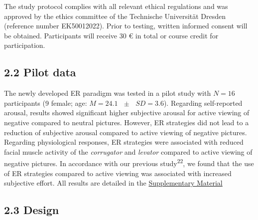 \documentclass[
  english,
  man,floatsintext]{apa6}
\begin{document}
The study protocol complies with all relevant ethical regulations and was approved by the ethics committee of the Technische Universität Dresden (reference number EK50012022).
Prior to testing, written informed consent will be obtained.
Participants will receive 30 € in total or course credit for participation.

\hypertarget{pilot-data}{%
\subsection{2.2 Pilot data}\label{pilot-data}}

The newly developed ER paradigm was tested in a pilot study with \(N=16\) participants (9 female; age: \(M = 24.1\text{ }\pm\text{ }SD = 3.6\)).
Regarding self-reported arousal, results showed significant higher subjective arousal for active viewing of negative compared to neutral pictures.
However, ER strategies did not lead to a reduction of subjective arousal compared to active viewing of negative pictures.
Regarding physiological responses, ER strategies were associated with reduced facial muscle activity of the \emph{corrugator} and \emph{levator} compared to active viewing of negative pictures.
In accordance with our previous study\textsuperscript{22}, we found that the use of ER strategies compared to active viewing was associated with increased subjective effort.
All results are detailed in the \protect\hyperlink{SupplementaryMaterial}{Supplementary Material}

\hypertarget{design}{%
\subsection{2.3 Design}\label{design}}
\end{document}
